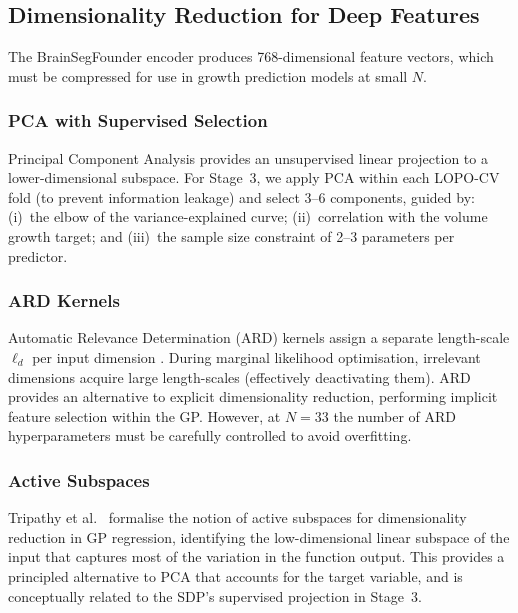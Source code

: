 \subsection{Dimensionality Reduction for Deep Features}
\label{sec:bg:dimred}

The BrainSegFounder encoder produces 768-dimensional feature vectors, which
must be compressed for use in growth prediction models at small $N$.

\subsubsection{PCA with Supervised Selection}

Principal Component Analysis provides an unsupervised linear projection to
a lower-dimensional subspace. For Stage~3, we apply PCA within each LOPO-CV
fold (to prevent information leakage) and select 3--6 components, guided
by: (i)~the elbow of the variance-explained curve; (ii)~correlation with
the volume growth target; and (iii)~the sample size constraint of 2--3
parameters per predictor.

\subsubsection{ARD Kernels}

Automatic Relevance Determination (ARD) kernels assign a separate length-scale
$\ell_d$ per input dimension \cite{rasmussen2006gaussian}. During marginal
likelihood optimisation, irrelevant dimensions acquire large length-scales
(effectively deactivating them). ARD provides an alternative to explicit
dimensionality reduction, performing implicit feature selection within the GP.
However, at $N = 33$ the number of ARD hyperparameters must be carefully
controlled to avoid overfitting.

\subsubsection{Active Subspaces}

Tripathy et al.\ \cite{tripathy2016active} formalise the notion of active
subspaces for dimensionality reduction in GP regression, identifying the
low-dimensional linear subspace of the input that captures most of the
variation in the function output. This provides a principled alternative to
PCA that accounts for the target variable, and is conceptually related to the
SDP's supervised projection in Stage~3.

